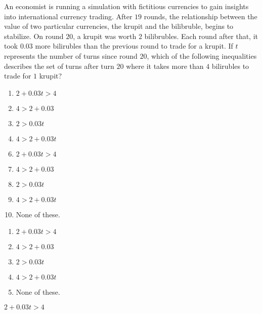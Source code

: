  
An economist is running a simulation with fictitious currencies to gain insights into international currency trading.  After $19$ rounds, the relationship between the value of two particular currencies, the krupit and the bilibruble, begins to stabilize. On round $20$, a krupit was worth $2$ bilibrubles.  Each round after that, it took $0.03$ more bilirubles than the previous round to trade for a krupit.  If $t$ represents the number of turns since round $20$, which of the following inequalities describes the set of turns after turn $20$ where it takes more than $4$ bilirubles to trade for $1$ krupit?


\ifsat
	\begin{enumerate}[label=\Alph*)]
		\item $2+0.03t>4 $ %
		\item $4>2+0.03 $ 
		\item $2>0.03t $ 
		\item $4>2+0.03t $
	\end{enumerate}
\else
\fi

\ifacteven
	\begin{enumerate}[label=\textbf{\Alph*.},itemsep=\fill,align=left]
		\setcounter{enumii}{5}
		\item $2+0.03t>4 $ %
		\item $4>2+0.03 $ 
		\item $2>0.03t $ 
		\addtocounter{enumii}{1}
		\item $4>2+0.03t $
		\item None of these. 
	\end{enumerate}
\else
\fi

\ifactodd
	\begin{enumerate}[label=\textbf{\Alph*.},itemsep=\fill,align=left]
		\item $2+0.03t>4 $ %
		\item $4>2+0.03 $ 
		\item $2>0.03t $ 
		\item $4>2+0.03t $
		\item None of these. 
	\end{enumerate}
\else
\fi

\ifgridin
 $2+0.03t>4 $ %
		
\else
\fi

